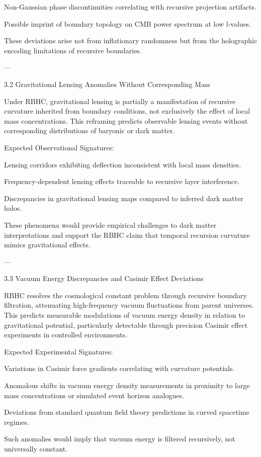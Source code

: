 \documentclass[11pt,a4paper]{article}
\begin{document}
Non-Gaussian phase discontinuities correlating with recursive projection artifacts.

Possible imprint of boundary topology on CMB power spectrum at low l-values.


These deviations arise not from inflationary randomness but from the holographic encoding limitations of recursive boundaries.


---

3.2 Gravitational Lensing Anomalies Without Corresponding Mass

Under RBHC, gravitational lensing is partially a manifestation of recursive curvature inherited from boundary conditions, not exclusively the effect of local mass concentrations. This reframing predicts observable lensing events without corresponding distributions of baryonic or dark matter.

Expected Observational Signatures:

Lensing corridors exhibiting deflection inconsistent with local mass densities.

Frequency-dependent lensing effects traceable to recursive layer interference.

Discrepancies in gravitational lensing maps compared to inferred dark matter halos.


These phenomena would provide empirical challenges to dark matter interpretations and support the RBHC claim that temporal recursion curvature mimics gravitational effects.


---

3.3 Vacuum Energy Discrepancies and Casimir Effect Deviations

RBHC resolves the cosmological constant problem through recursive boundary filtration, attenuating high-frequency vacuum fluctuations from parent universes. This predicts measurable modulations of vacuum energy density in relation to gravitational potential, particularly detectable through precision Casimir effect experiments in controlled environments.

Expected Experimental Signatures:

Variations in Casimir force gradients correlating with curvature potentials.

Anomalous shifts in vacuum energy density measurements in proximity to large mass concentrations or simulated event horizon analogues.

Deviations from standard quantum field theory predictions in curved spacetime regimes.


Such anomalies would imply that vacuum energy is filtered recursively, not universally constant.
\end{document}
